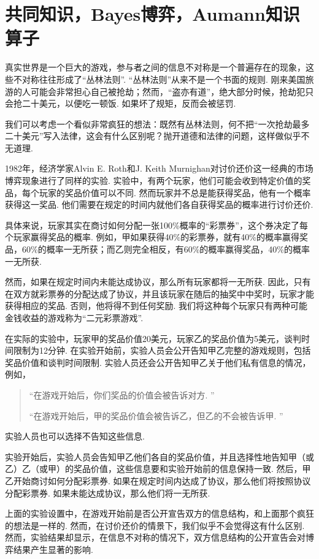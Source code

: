 \chapter{共同知识，Bayes博弈，Aumann知识算子}\label{chap:bayesian-game}

真实世界是一个巨大的游戏，参与者之间的信息不对称是一个普遍存在的现象，这些不对称往往形成了“丛林法则”. “丛林法则”从来不是一个书面的规则. 刚来美国旅游的人可能会非常担心自己被抢劫；然而，“盗亦有道”，绝大部分时候，抢劫犯只会抢二十美元，以便吃一顿饭. 如果坏了规矩，反而会被惩罚. 

我们可以考虑一个看似非常疯狂的想法：既然有丛林法则，何不把“一次抢劫最多二十美元”写入法律，这会有什么区别呢？抛开道德和法律的问题，这样做似乎不无道理. 

1982年，经济学家Alvin E. Roth和J. Keith Murnighan对讨价还价这一经典的市场博弈现象进行了同样的实验. 实验中，有两个玩家，他们可能会收到特定价值的奖品，每个玩家的奖品价值可以不同. 然而玩家并不总是能获得奖品，他有一个概率获得这一奖品. 他们需要在规定的时间内就他们各自获得奖品的概率进行讨价还价. 

具体来说，玩家其实在商讨如何分配一张100\%概率的“彩票券”，这个券决定了每个玩家赢得奖品的概率. 例如，甲如果获得40\%的彩票券，就有40\%的概率赢得奖品，60\%的概率一无所获；而乙则完全相反，有60\%的概率赢得奖品，40\%的概率一无所获. 

然而，如果在规定时间内未能达成协议，那么所有玩家都将一无所获. 因此，只有在双方就彩票券的分配达成了协议，并且该玩家在随后的抽奖中中奖时，玩家才能获得相应的奖品. 否则，他将得不到任何奖励. 我们将这种每个玩家只有两种可能金钱收益的游戏称为“二元彩票游戏”. 

在实际的实验中，玩家甲的奖品价值20美元，玩家乙的奖品价值为5美元，谈判时间限制为12分钟. 在实验开始前，实验人员会公开告知甲乙完整的游戏规则，包括奖品价值和谈判时间限制. 实验人员还会公开告知甲乙关于他们私有信息的情况，例如，
\begin{quotation}
    “在游戏开始后，你们奖品的价值会被告诉对方. ”

    “在游戏开始后，甲的奖品价值会被告诉乙，但乙的不会被告诉甲. ”
\end{quotation}
实验人员也可以选择不告知这些信息. 

实验开始后，实验人员会告知甲乙他们各自的奖品价值，并且选择性地告知甲（或乙）乙（或甲）的奖品价值，这些信息要和实验开始前的信息保持一致. 然后，甲乙开始商讨如何分配彩票券. 如果在规定时间内达成了协议，那么他们将按照协议分配彩票券. 如果未能达成协议，那么他们将一无所获. 

上面的实验设置中，在游戏开始前是否公开宣告双方的信息结构，和上面那个疯狂的想法是一样的. 然而，在讨价还价的情景下，我们似乎不会觉得这有什么区别. 然而，实验结果却显示，在信息不对称的情况下，双方信息结构的公开宣告会对博弈结果产生显著的影响. 

